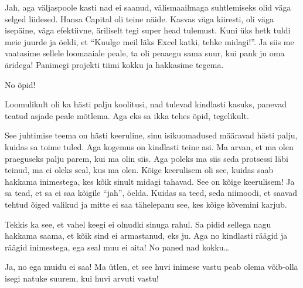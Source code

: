 
Jah, aga väljaspoole kasti nad ei saanud, välismaailmaga suhtlemiseks olid väga selged liidesed. Hansa Capital oli teine näide. Kasvas  väga kiiresti, oli väga isepäine, väga efektiivne, äriliselt tegi super head tulemust. Kuni üks hetk tuldi meie juurde ja öeldi, et \enquote{Kuulge meil läks Excel katki, tehke midagi!}. Ja siis me vaatasime sellele loomaaiale peale, ta oli peaaegu sama suur, kui pank ju oma äridega! Panimegi projekti tiimi kokku ja hakkasime tegema. 


No õpid! 

Loomulikult oli ka hästi palju koolitusi, nad tulevad kindlasti kasuks, panevad teatud asjade peale mõtlema. Aga eks sa ikka tehes õpid, tegelikult. 

See juhtimise teema on hästi keeruline, sinu isikuomadused määravad hästi palju, kuidas sa toime tuled. Aga kogemus on kindlasti teine asi. Ma arvan, et ma olen praeguseks palju parem, kui ma olin siis. Aga poleks ma siis seda protsessi läbi teinud,  ma ei oleks seal, kus ma olen. Kõige keerulisem oli see, kuidas saab hakkama inimestega, kes kõik sinult midagi tahavad. See  on kõige keerulisem! Ja sa tead, et sa ei saa kõigile \enquote{jah}, öelda. Kuidas sa teed, seda niimoodi, et saavad tehtud õiged valikud ja mitte ei saa tähelepanu see, kes kõige kõvemini karjub. 


Tekkis ka see, et vahel keegi ei olnudki sinuga rahul. Sa pidid sellega nagu hakkama saama, et kõik sind ei armastanud, eks ju. Aga no kindlasti räägid ja räägid inimestega, ega seal muu ei aita! No paned nad kokku\ldots


Ja, no ega muidu ei saa! Ma ütlen, et see huvi inimese vastu peab olema võib-olla isegi natuke suurem, kui huvi arvuti vastu! 


